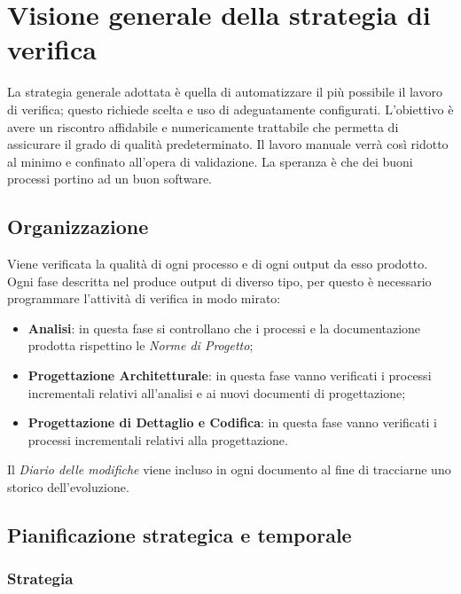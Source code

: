 \section{Visione generale della strategia di verifica}

La strategia generale adottata è quella di automatizzare il più possibile il lavoro di verifica; questo richiede scelta e uso di  adeguatamente configurati. L'obiettivo è avere un riscontro affidabile e numericamente trattabile che permetta di assicurare il grado di qualità predeterminato. Il lavoro manuale verrà così ridotto al minimo e confinato all'opera di validazione.
La speranza è che dei buoni processi portino ad un buon software.
	
	\subsection{Organizzazione}
	Viene verificata la qualità di ogni processo e di ogni output da esso prodotto. Ogni fase  descritta nel \PianoDiProgetto{} produce output di diverso tipo, per questo è necessario programmare l'attività di verifica in modo mirato:

	\begin{itemize}
		\item \textbf{Analisi}: in questa fase si controllano che i processi e la documentazione prodotta rispettino le \emph{Norme di Progetto};
		\item \textbf{Progettazione Architetturale}: in questa fase vanno verificati i processi incrementali relativi all'analisi e ai nuovi documenti di progettazione;
		\item \textbf{Progettazione di Dettaglio e Codifica}: in questa fase vanno verificati i processi incrementali relativi alla progettazione.
	\end{itemize}
	
	Il \emph{Diario delle modifiche} viene incluso in ogni documento al fine di tracciarne uno storico dell'evoluzione.
	
	\subsection{Pianificazione strategica e temporale}
		\subsubsection{Strategia}

